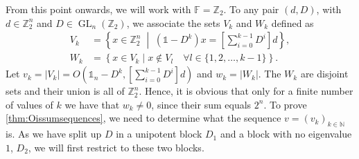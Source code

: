 \documentclass[a4paper]{article}
\theoremstyle{plain}
\theoremstyle{definition}
\theoremstyle{remark}
\DeclareMathOperator{\GL}{GL}
\newcommand{\I}{\mathds{1}}
\newcommand{\NN}{{\mathbb{N}}}
\newcommand{\ZZ}{{\mathbb{Z}}}
\newcommand{\FF}{{\mathbb{F}}}
\begin{document}
From this point onwards, we will work with \(\FF = \ZZ_2\). To any pair \((d,D)\), with $d\in \ZZ_2^n$ and $D\in \GL_n(\ZZ_2)$, we associate the sets \(V_k\) and \(W_k\) defined as
\begin{align*}
V_k &= \left\{x \in \ZZ_2^n  \;\middle|\; (\I - D^k)x = \left[\sum_{i=0}^{k-1}D^i\right] d \right\},\\
W_k &= \left\{ x \in V_k  \;|\; x \notin V_l \quad \forall l \in \{1,2, \dots, k-1\}\right\}.
\end{align*}
Let \(v_k = |V_k| = O\left(\I_n-D^k,\left[\sum_{i=0}^{k-1}D^i\right] d\right)\) and \(w_k = |W_k|\). The $W_k$ are disjoint sets and their union is all of $\ZZ_2^n$. Hence, it is obvious that only for a finite number of values of $k$ we have that $w_k\neq 0$,  since their sum equals $2^n$. To prove \cref{thm:Oissumsequences}, we need to determine what the sequence  \(v = (v_k)_{k \in \NN}\) is. As we have split up \(D\) in a unipotent block \(D_1\) and a block with no eigenvalue \(1\), \(D_2\), we will first restrict to these two blocks.
\end{document}
